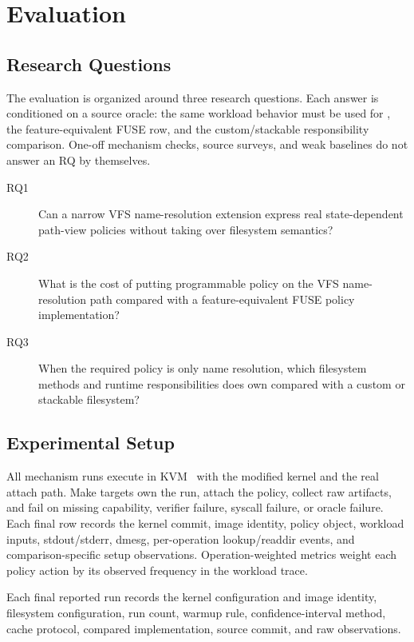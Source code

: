 \section{Evaluation}
\label{sec:evaluation}

\subsection{Research Questions}

The evaluation is organized around three research questions. Each answer is
conditioned on a source oracle: the same workload behavior must be used for
\namei, the feature-equivalent FUSE row, and the custom/stackable
responsibility comparison.
One-off mechanism checks, source surveys, and weak baselines do not answer an
RQ by themselves.

\begin{description}
\item[RQ1] Can a narrow VFS name-resolution extension express real
state-dependent path-view policies without taking over filesystem semantics?
\item[RQ2] What is the cost of putting programmable policy on the VFS
name-resolution path compared with a feature-equivalent FUSE policy
implementation?
\item[RQ3] When the required policy is only name resolution, which filesystem
methods and runtime responsibilities does \namei own compared with a custom or
stackable filesystem?
\end{description}

\subsection{Experimental Setup}

All \namei mechanism runs execute in KVM~\cite{linux_kvm} with the modified
kernel and the real  attach path. Make targets own the
run, attach the policy, collect raw artifacts, and fail on missing capability,
verifier failure, syscall failure, or oracle failure. Each final row records the
kernel commit, image identity, policy object, workload inputs, stdout/stderr,
dmesg, per-operation lookup/readdir events, and comparison-specific setup
observations.
Operation-weighted metrics weight each policy action by its observed frequency
in the workload trace.

Each final reported run records the kernel configuration and image identity,
filesystem configuration, run count, warmup rule, confidence-interval method,
cache protocol, compared implementation, source commit, and raw observations.

